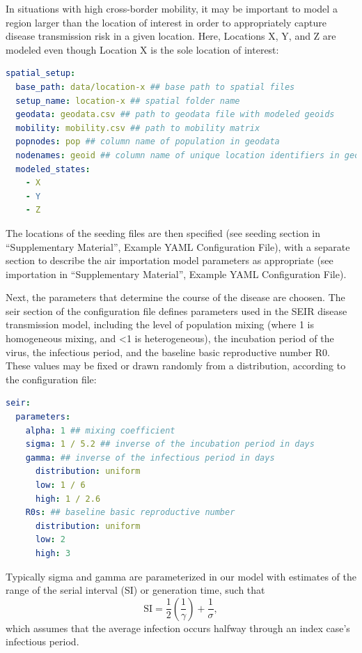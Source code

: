 In situations with high cross-border mobility, it may be important to model a region larger than the location of interest in order to appropriately capture disease transmission risk in a given location. Here, Locations X, Y, and Z are modeled even though Location X is the sole location of interest:
\begin{lstlisting}[language=yaml]
spatial_setup: 
  base_path: data/location-x ## base path to spatial files 
  setup_name: location-x ## spatial folder name 
  geodata: geodata.csv ## path to geodata file with modeled geoids 
  mobility: mobility.csv ## path to mobility matrix 
  popnodes: pop ## column name of population in geodata 
  nodenames: geoid ## column name of unique location identifiers in geodata 
  modeled_states: 
    - X 
    - Y 
    - Z
\end{lstlisting}

The locations of the seeding files are then specified (see seeding section in “Supplementary Material”, Example YAML Configuration File), with a separate section to describe the air importation model parameters as appropriate (see importation in “Supplementary Material”, Example YAML Configuration File).

Next, the parameters that determine the course of the disease are choosen. The seir section of the configuration file defines parameters used in the SEIR disease transmission model, including the level of population mixing (where 1 is homogeneous mixing, and <1 is heterogeneous), the incubation period of the virus, the infectious period, and the baseline basic reproductive number R0. These values may be fixed or drawn randomly from a distribution, according to the configuration file:
\begin{lstlisting}[language=yaml]
seir: 
  parameters: 
    alpha: 1 ## mixing coefficient 
    sigma: 1 / 5.2 ## inverse of the incubation period in days 
    gamma: ## inverse of the infectious period in days 
      distribution: uniform 
      low: 1 / 6 
      high: 1 / 2.6 
    R0s: ## baseline basic reproductive number 
      distribution: uniform 
      low: 2 
      high: 3
\end{lstlisting}

Typically sigma and gamma are parameterized in our model with estimates of the range of the serial interval (SI) or generation time, such that
\begin{equation}
\text{SI}=\frac{1}{2}\left(\frac{1}{\gamma }\right)+\frac{1}{\sigma },
\end{equation}
which assumes that the average infection occurs halfway through an index case’s infectious period.

